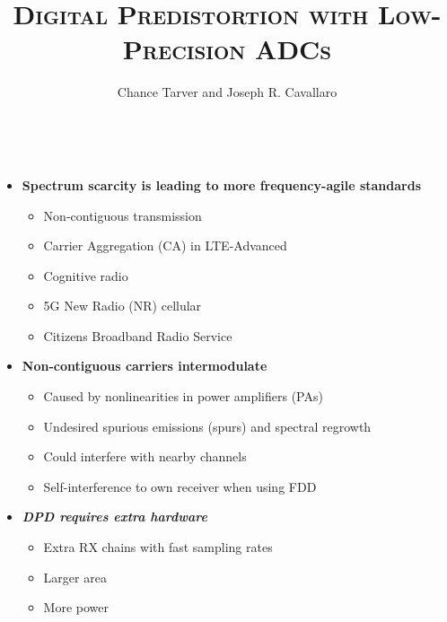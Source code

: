 \documentclass[25pt]{tikzposter} %
\title{\bf \textsc{Digital Predistortion with Low-Precision ADCs}}
\institute{Rice University} %
\author{Chance Tarver and Joseph R. Cavallaro}
\begin{document}
\maketitle %

\begin{columns} %
	\centering
	{    \Large
		\begin{itemize}
			\item {\bf Spectrum scarcity is leading to more frequency-agile standards}
			      \begin{itemize}
				      \item Non-contiguous transmission
				      \item Carrier Aggregation (CA) in LTE-Advanced
				      \item Cognitive radio
				      \item 5G New Radio (NR) cellular
				      \item Citizens Broadband Radio Service
			      \end{itemize}
			\item {\bf Non-contiguous carriers intermodulate}
			      \begin{itemize}
				      \item Caused by nonlinearities in power amplifiers (PAs)
				      \item Undesired spurious emissions (spurs) and spectral regrowth
				      \item Could interfere with nearby channels
				      \item Self-interference to own receiver when using FDD
			      \end{itemize}
			\item{\textbf{\textit{ DPD requires extra hardware}}}
				\begin{itemize}
					\item Extra RX chains with fast sampling rates 
					\item Larger area
					\item More power

\end{itemize}
\end{itemize}}
\end{columns}
\end{document}
